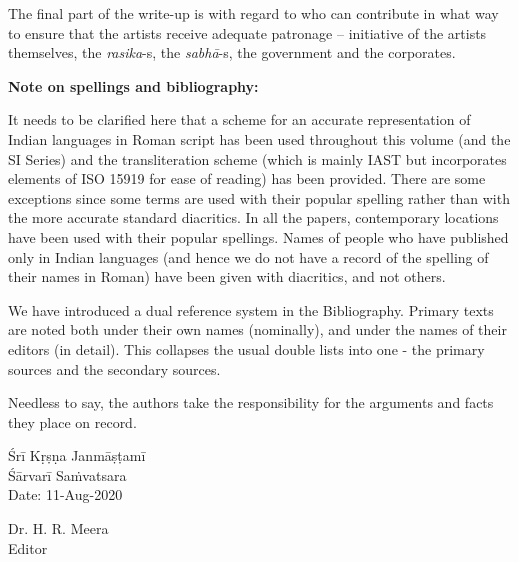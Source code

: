 The final part of the write-up is with regard to who can contribute in what way to ensure that the artists receive adequate patronage – initiative of the artists themselves, the \textit{rasika}-s, the \textit{sabhā}-s, the government and the corporates.

\delimiter

\textbf{Note on spellings and bibliography: }

It needs to be clarified here that a scheme for an accurate representation of Indian languages in Roman script has been used throughout this volume (and the SI Series) and the transliteration scheme (which is mainly IAST but incorporates elements of ISO 15919 for ease of reading) has been provided. There are some exceptions since some terms are used with their popular spelling rather than with the more accurate standard diacritics. In all the papers, contemporary locations have been used with their popular spellings. Names of people who have published only in Indian languages (and hence we do not have a record of the spelling of their names in Roman) have been given with diacritics, and not others.

We have introduced a dual reference system in the Bibliography. Primary texts are noted both under their own names (nominally), and under the names of their editors (in detail). This collapses the usual double lists into one - the primary sources and the secondary sources.

Needless to say, the authors take the responsibility for the arguments and facts they place on record.

\vspace{.2cm}

Śrī Kṛṣṇa Janmāṣṭamī\\ Śārvarī Saṁvatsara\\ Date: 11-Aug-2020

\vspace{-1.7cm}

\begin{flushright}
Dr. H. R. Meera\\ Editor
\end{flushright}

\theendnotes

